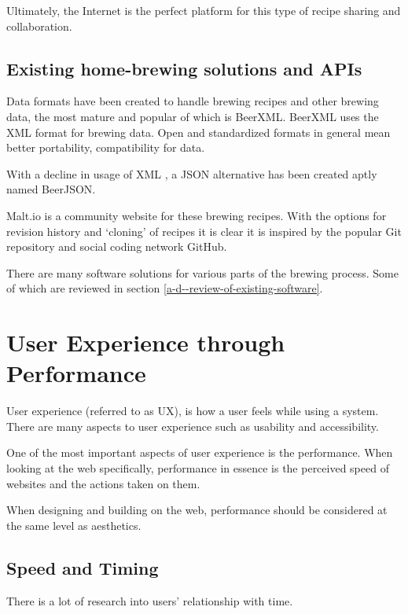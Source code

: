 Ultimately, the Internet is the perfect platform for this type of recipe sharing and collaboration.

\subsection{Existing home-brewing solutions and APIs} \label{l-r--exisiting-home-brewing-solutions}

Data formats have been created to handle brewing recipes and other brewing data, the most mature and popular of which is BeerXML. BeerXML uses the XML format for brewing data. \cite{beerxml} Open and standardized formats in general mean better portability, compatibility for data.

With a decline in usage of XML \cite{jsonxml}, a JSON alternative has been created aptly named BeerJSON. \cite{beerjson}

Malt.io is a community website for these brewing recipes. With the options for revision history and `cloning' of recipes it is clear it is inspired by the popular Git repository and social coding network GitHub. \cite{malt.io}

There are many software solutions for various parts of the brewing process. Some of which are reviewed in section \ref{a-d--review-of-existing-software}.

\section{User Experience through Performance} \label{l-r--user-experience-performance}

User experience (referred to as UX), is how a user feels while using a system. There are many aspects to user experience such as usability and accessibility. \cite{what_is_ux}

One of the most important aspects of user experience is the performance. When looking at the web specifically, performance in essence is the perceived speed of websites and the actions taken on them.

When designing and building on the web, performance should be considered at the same level as aesthetics. \cite{performance_is_ux}

\subsection{Speed and Timing} \label{l-r--speed}

There is a lot of research into users' relationship with time.

